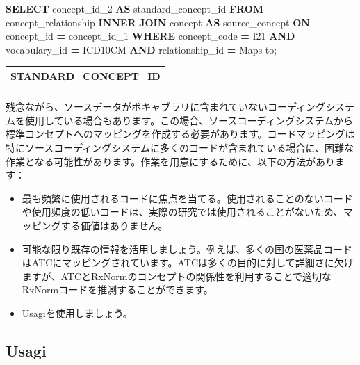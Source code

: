 \documentclass[
  11pt]{book}
\newenvironment{Shaded}{\begin{snugshade}}{\end{snugshade}}
\newcommand{\KeywordTok}[1]{\textcolor[rgb]{0.13,0.29,0.53}{\textbf{#1}}}
\newcommand{\NormalTok}[1]{#1}
\newcommand{\OperatorTok}[1]{\textcolor[rgb]{0.81,0.36,0.00}{\textbf{#1}}}
\newcommand{\StringTok}[1]{\textcolor[rgb]{0.31,0.60,0.02}{#1}}
\providecommand{\tightlist}{%
  \setlength{\itemsep}{0pt}\setlength{\parskip}{0pt}}
\theoremstyle{definition}
\theoremstyle{definition}
\theoremstyle{definition}
\theoremstyle{definition}
\theoremstyle{remark}
\begin{document}
\begin{Shaded}
\begin{Highlighting}[]
\KeywordTok{SELECT}\NormalTok{ concept\_id\_2 }\KeywordTok{AS}\NormalTok{ standard\_concept\_id}
\KeywordTok{FROM}\NormalTok{ concept\_relationship}
\KeywordTok{INNER} \KeywordTok{JOIN}\NormalTok{ concept }\KeywordTok{AS}\NormalTok{ source\_concept}
  \KeywordTok{ON}\NormalTok{ concept\_id }\OperatorTok{=}\NormalTok{ concept\_id\_1}
\KeywordTok{WHERE}\NormalTok{ concept\_code }\OperatorTok{=} \StringTok{\textquotesingle{}I21\textquotesingle{}}
  \KeywordTok{AND}\NormalTok{ vocabulary\_id }\OperatorTok{=} \StringTok{\textquotesingle{}ICD10CM\textquotesingle{}}
  \KeywordTok{AND}\NormalTok{ relationship\_id }\OperatorTok{=} \StringTok{\textquotesingle{}Maps to\textquotesingle{}}\NormalTok{;}
\end{Highlighting}
\end{Shaded}

\begin{longtable}[]{@{}r@{}}
\toprule\noalign{}
STANDARD\_CONCEPT\_ID \\
\midrule\noalign{}
\endhead
\bottomrule\noalign{}
\endlastfoot
312327 \\
\end{longtable}

残念ながら、ソースデータがボキャブラリに含まれていないコーディングシステムを使用している場合もあります。この場合、ソースコーディングシステムから標準コンセプトへのマッピングを作成する必要があります。コードマッピングは特にソースコーディングシステムに多くのコードが含まれている場合に、困難な作業となる可能性があります。作業を用意にするために、以下の方法があります：

\begin{itemize}
\tightlist
\item
  最も頻繁に使用されるコードに焦点を当てる。使用されることのないコードや使用頻度の低いコードは、実際の研究では使用されることがないため、マッピングする価値はありません。
\item
  可能な限り既存の情報を活用しましょう。例えば、多くの国の医薬品コードはATCにマッピングされています。ATCは多くの目的に対して詳細さに欠けますが、ATCとRxNormのコンセプトの関係性を利用することで適切なRxNormコードを推測することができます。
\item
  Usagiを使用しましょう。
\end{itemize}

\subsection{Usagi}\label{usagi}
\end{document}
